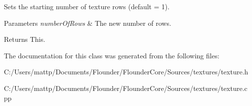Sets the starting number of texture rows (default = 1). 


\begin{DoxyParams}{Parameters}
{\em number\+Of\+Rows} & The new number of rows. \\
\hline
\end{DoxyParams}
\begin{DoxyReturn}{Returns}
This. 
\end{DoxyReturn}


The documentation for this class was generated from the following files\+:\begin{DoxyCompactItemize}
\item 
C\+:/\+Users/mattp/\+Documents/\+Flounder/\+Flounder\+Core/\+Sources/textures/texture.\+h\item 
C\+:/\+Users/mattp/\+Documents/\+Flounder/\+Flounder\+Core/\+Sources/textures/texture.\+cpp\end{DoxyCompactItemize}
